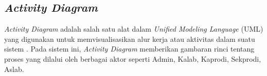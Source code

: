 
\subsection{\textit{Activity Diagram}}
\textit{Activity Diagram} adalah salah satu alat dalam \textit{Unified Modeling Language} (UML) yang digunakan untuk memvisualisasikan alur kerja atau aktivitas dalam suatu sistem \cite{linzhang2004generating}. Pada sistem ini, \textit{Activity Diagram} memberikan gambaran rinci tentang proses yang dilalui oleh berbagai aktor seperti Admin, Kalab, Kaprodi, Sekprodi, Aslab.

